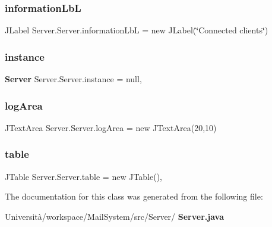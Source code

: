 \subsubsection{information\+LbL}
{\footnotesize\ttfamily J\+Label Server.\+Server.\+information\+LbL = new J\+Label(\char`\"{}Connected clients\char`\"{})}

\mbox{\label{class_server_1_1_server_ab41e1d79d9a27265e07799617bf0e938}} 
\subsubsection{instance}
{\footnotesize\ttfamily \textbf{ Server} Server.\+Server.\+instance = null\hspace{0.3cm}{\ttfamily [static]}, {\ttfamily [private]}}

\mbox{\label{class_server_1_1_server_a6025e5088253b48b18de11fb4d517f67}} 
\subsubsection{log\+Area}
{\footnotesize\ttfamily J\+Text\+Area Server.\+Server.\+log\+Area = new J\+Text\+Area(20,10)\hspace{0.3cm}{\ttfamily [static]}}

\mbox{\label{class_server_1_1_server_afcc2d7b41035345575e927dbef123e8f}} 
\subsubsection{table}
{\footnotesize\ttfamily J\+Table Server.\+Server.\+table = new J\+Table()\hspace{0.3cm}{\ttfamily [static]}, {\ttfamily [private]}}



The documentation for this class was generated from the following file\+:\begin{DoxyCompactItemize}
\item 
Università/workspace/\+Mail\+System/src/\+Server/\textbf{ Server.\+java}\end{DoxyCompactItemize}
